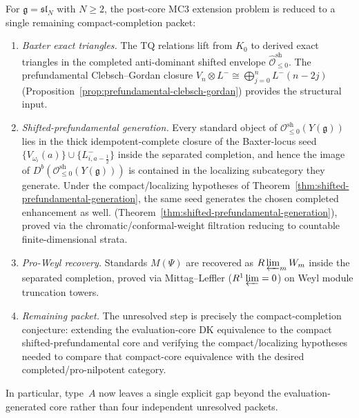 \begin{theorem}
\label{thm:mc3-type-a-resolution}
For $\mathfrak{g} = \mathfrak{sl}_N$ with $N \geq 2$, the
post-core MC3 extension problem is reduced to a single remaining
compact-completion packet:
\begin{enumerate}[label=\textup{(\roman*)},nosep]
\item \emph{Baxter exact triangles.}
 The TQ relations lift from $K_0$ to derived exact triangles in the
 completed anti-dominant shifted envelope
 $\widehat{\mathcal{O}}^{\mathrm{sh}}_{\leq 0}$.
 The prefundamental Clebsch--Gordan closure
 $V_n \otimes L^- \cong \bigoplus_{j=0}^{n} L^-(n{-}2j)$
 \textup{(}Proposition~\textup{\ref{prop:prefundamental-clebsch-gordan}}\textup{)}
 provides the structural input.
\item \emph{Shifted-prefundamental generation.}
 Every standard object of
 $\mathcal{O}^{\mathrm{sh}}_{\leq 0}(Y(\mathfrak{g}))$ lies in the
 thick idempotent-complete closure of the Baxter-locus seed
 $\{V_{\omega_i}(a)\} \cup \{L^-_{i,a-\frac{1}{2}}\}$ inside the
 separated completion, and hence the image of
 $D^b(\mathcal{O}^{\mathrm{sh}}_{\leq 0}(Y(\mathfrak{g})))$
 is contained in the localizing subcategory they generate. Under the
 compact/localizing hypotheses of
 Theorem~\ref{thm:shifted-prefundamental-generation}, the same seed
 generates the chosen completed enhancement as well.
 \textup{(}Theorem~\textup{\ref{thm:shifted-prefundamental-generation}}\textup{)},
 proved via the chromatic/conformal-weight filtration reducing to
 countable finite-dimensional strata.
\item \emph{Pro-Weyl recovery.}
 Standards $M(\Psi)$ are recovered as $R\varprojlim_m W_m$ inside the
 separated completion, proved via Mittag--Leffler
 ($R^1\varprojlim = 0$) on Weyl module truncation towers.
\item \emph{Remaining packet.}
The unresolved step is precisely the compact-completion conjecture:
extending the
evaluation-core DK equivalence to the compact shifted-prefundamental
core and verifying the compact/localizing hypotheses needed to compare
 that compact-core equivalence with the desired
 completed/pro-nilpotent category.
\end{enumerate}
In particular, type~$A$ now leaves a single explicit gap beyond the
evaluation-generated core rather than four independent unresolved
packets.
\end{theorem}

